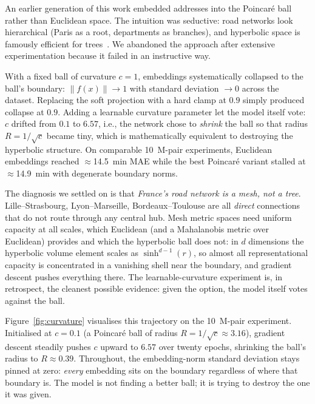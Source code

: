 \documentclass[11pt,a4paper]{article}
\begin{document}
An earlier generation of this work embedded addresses into the
Poincar\'e ball rather than Euclidean space. The intuition was
seductive: road networks look hierarchical (Paris as a root,
departments as branches), and hyperbolic space is famously efficient
for trees~\cite{nickel2017poincare}. We abandoned the approach after
extensive experimentation because it failed in an instructive way.

With a fixed ball of curvature $c = 1$, embeddings systematically
collapsed to the ball's boundary: $\|f(x)\| \to 1$ with standard
deviation $\to 0$ across the dataset. Replacing the soft projection
with a hard clamp at $0.9$ simply produced collapse at $0.9$. Adding
a learnable curvature parameter let the model itself vote: $c$
drifted from $0.1$ to $6.57$, i.e., the network chose to
\emph{shrink} the ball so that radius $R = 1/\sqrt{c}$ became tiny,
which is mathematically equivalent to destroying the hyperbolic
structure. On comparable 10~M-pair experiments, Euclidean embeddings
reached $\approx$14.5~min MAE while the best Poincar\'e variant
stalled at $\approx$14.9~min with degenerate boundary norms.

The diagnosis we settled on is that \emph{France's road network is
a mesh, not a tree}. Lille--Strasbourg, Lyon--Marseille,
Bordeaux--Toulouse are all \emph{direct} connections that do not
route through any central hub. Mesh metric spaces need uniform
capacity at all scales, which Euclidean (and a Mahalanobis metric
over Euclidean) provides and which the hyperbolic ball does not: in
$d$ dimensions the hyperbolic volume element scales as
$\sinh^{d-1}(r)$, so almost all representational capacity is
concentrated in a vanishing shell near the boundary, and gradient
descent pushes everything there. The learnable-curvature experiment
is, in retrospect, the cleanest possible evidence: given the option,
the model itself votes against the ball.

Figure~\ref{fig:curvature} visualises this trajectory on the 10~M-pair
experiment. Initialised at $c = 0.1$ (a Poincar\'e ball of radius
$R = 1/\sqrt{c} \approx 3.16$), gradient descent steadily pushes
$c$ upward to $6.57$ over twenty epochs, shrinking the ball's radius
to $R \approx 0.39$. Throughout, the embedding-norm standard
deviation stays pinned at zero: \emph{every} embedding sits on the
boundary regardless of where that boundary is. The model is not
finding a better ball; it is trying to destroy the one it was given.
\end{document}
